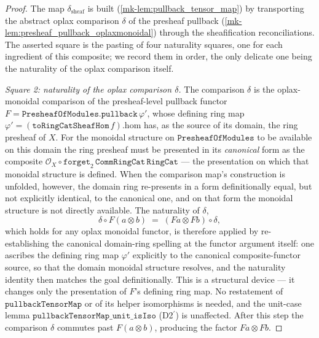\begin{proof}
  \leanok
  The map \(\delta_{\mathrm{sheaf}}\) is built (\ref{mk-lem:pullback_tensor_map}) by
  transporting the abstract oplax comparison \(\delta\) of the presheaf pullback
  (\ref{mk-lem:presheaf_pullback_oplaxmonoidal}) through the sheafification
  reconciliations. The asserted square is the pasting of four naturality squares, one for
  each ingredient of this composite; we record them in order, the only delicate one being the
  naturality of the oplax comparison itself.

  \emph{Square 2: naturality of the oplax comparison \(\delta\).} The comparison \(\delta\) is
  the oplax-monoidal comparison of the presheaf-level pullback functor
  \(F = \mathtt{PresheafOfModules.pullback}\,\varphi'\), whose defining ring map
  \(\varphi' = (\mathtt{toRingCatSheafHom}\,f).\mathrm{hom}\) has, as the source of its domain,
  the ring presheaf of \(X\). For the monoidal structure on \(\mathtt{PresheafOfModules}\) to
  be available on this domain the ring presheaf must be presented in its \emph{canonical}
  form as the composite
  \(\mathcal{O}_X \circ \mathtt{forget}_2\,\mathtt{CommRingCat}\,\mathtt{RingCat}\) --- the
  presentation on which that monoidal structure is defined. When the comparison map's
  construction is unfolded, however, the domain ring re-presents in a form definitionally
  equal, but not explicitly identical, to the canonical one, and on that form the
  monoidal structure is not directly available. The naturality of \(\delta\),
  \[
    \delta \circ F(a \otimes b) \;=\; (Fa \otimes Fb) \circ \delta,
  \]
  which holds for any oplax monoidal functor, is therefore applied by re-establishing the
  canonical domain-ring spelling at the functor argument itself: one ascribes the defining
  ring map \(\varphi'\) explicitly to the canonical composite-functor source, so that the
  domain monoidal structure resolves, and the naturality identity then matches the goal
  definitionally. This is a structural device --- it changes only the presentation of
  \(F\)'s defining ring map. No restatement of \(\mathtt{pullbackTensorMap}\) or of its helper
  isomorphisms is needed, and the unit-case lemma \(\mathtt{pullbackTensorMap\_unit\_isIso}\)
  (D2\(^\prime\)) is unaffected. After this step the comparison \(\delta\) commutes past
  \(F(a \otimes b)\), producing the factor \(Fa \otimes Fb\).


\end{proof}
